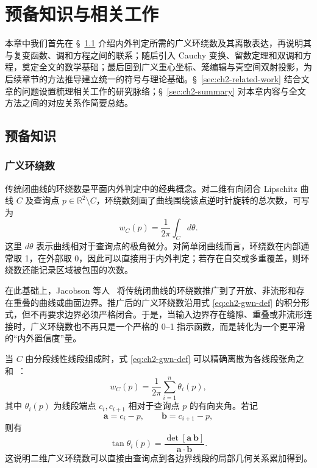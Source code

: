 \chapter{预备知识与相关工作}

本章中我们首先在 \S~\ref{sec:ch2-preliminaries} 介绍内外判定所需的广义环绕数及其离散表达，再说明其与复变函数、调和方程之间的联系；随后引入 Cauchy 变换、留数定理和双调和方程，奠定全文的数学基础；最后回到广义重心坐标、笼编辑与壳空间双射投影，为后续章节的方法推导建立统一的符号与理论基础。\S~\ref{sec:ch2-related-work} 结合文章的问题设置梳理相关工作的研究脉络；\S~\ref{sec:ch2-summary} 对本章内容与全文方法之间的对应关系作简要总结。
\section{预备知识}\label{sec:ch2-preliminaries}
\subsection{广义环绕数}
传统闭曲线的环绕数是平面内外判定中的经典概念。对二维有向闭合 Lipschitz 曲线 \(C\) 及查询点 \(p\in\mathbb{R}^2\setminus C\)，环绕数刻画了曲线围绕该点逆时针旋转的总次数，可写为
\begin{equation}
w_C(p)=\frac{1}{2\pi}\int_C d\theta.
\label{eq:ch2-gwn-def}
\end{equation}
这里 \(d\theta\) 表示曲线相对于查询点的极角微分。对简单闭曲线而言，环绕数在内部通常取 1，在外部取 0，因此可以直接用于内外判定；若存在自交或多重覆盖，则环绕数还能记录区域被包围的次数。

在此基础上，Jacobson 等人~\cite{Jacobson2013RobustIS} 将传统闭曲线的环绕数推广到了开放、非流形和存在重叠的曲线或曲面边界。推广后的广义环绕数沿用式 \eqref{eq:ch2-gwn-def} 的积分形式，但不再要求边界必须严格闭合。于是，当输入边界存在缝隙、重叠或非流形连接时，广义环绕数也不再只是一个严格的 0--1 指示函数，而是转化为一个更平滑的“内外置信度”量。

当 \(C\) 由分段线性线段组成时，式 \eqref{eq:ch2-gwn-def} 可以精确离散为各线段张角之和~\cite{Jacobson2013RobustIS}：
\begin{equation}
w_C(p)=\frac{1}{2\pi}\sum_{i=1}^{n}\theta_i(p),
\label{eq:ch2-gwn-polyline}
\end{equation}
其中 \(\theta_i(p)\) 为线段端点 \(c_i,c_{i+1}\) 相对于查询点 \(p\) 的有向夹角。若记
\[
\mathbf{a}=c_i-p,\qquad \mathbf{b}=c_{i+1}-p,
\]
则有
\begin{equation}
\tan \theta_i(p)=\frac{\det[\mathbf{a}\ \mathbf{b}]}{\mathbf{a}\cdot\mathbf{b}}.
\label{eq:ch2-gwn-angle}
\end{equation}
这说明二维广义环绕数可以直接由查询点到各边界线段的局部几何关系累加得到。

